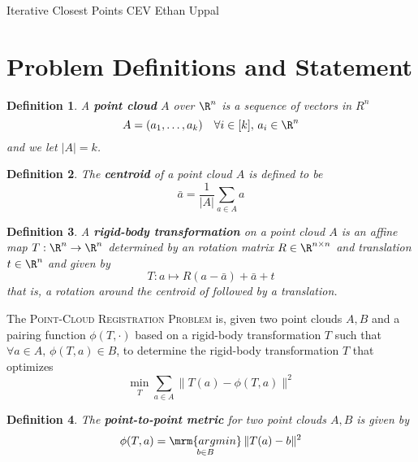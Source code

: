 \documentclass[12pt]{article}
\theoremstyle{defstyle}
\newtheorem{defn}{Definition}
\begin{document}
\begin{generic}
    Iterative Closest Points \hfill CEV \vbar Ethan Uppal
\end{generic}

\section{Problem Definitions and Statement}

\begin{defn}
    A \textbf{point cloud} $A$ over $\R^n$ is a sequence of vectors in $R^n$
    \[
        A = (a_1, \dots, a_k) \quad \forall i \in [k],\, a_i \in \R^n
    \]
    and we let $|A| = k$.
\end{defn}

\begin{defn}
    The \textbf{centroid} of a point cloud $A$ is defined to be
    \[
        \bar{a} = \frac{1}{|A|} \sum_{a \in A} a
    \]
\end{defn}

\begin{defn}
    A \textbf{rigid-body transformation} on a point cloud $A$ is an affine map $T : \R^n \to \R^n$ determined by an rotation matrix $R \in \R^{n \times n}$ and translation $t \in \R^n$ and given by
    \[
        T : a \mapsto R(a - \bar{a}) + \bar{a} + t
    \]
    that is, a rotation around the centroid of followed by a translation.
\end{defn}

\begin{outline}
    The \textsc{Point-Cloud Registration Problem} is, given two point clouds $A, B$ and a pairing function $\phi(T, \cdot)$ based on a rigid-body transformation $T$ such that $\forall a \in A,\, \phi(T, a) \in B$, to determine the rigid-body transformation $T$ that optimizes
    \begin{equation}\label{icp}
        \min\limits_{\substack{T}} \sum_{a \in A} \| T(a) - \phi(T, a) \|^2
    \end{equation}
\end{outline}

\begin{defn}
    The \textbf{point-to-point metric} for two point clouds $A, B$ is given by
    \begin{equation}
        \phi(T, a) = \mathop{\mrm{argmin}}\limits_{\substack{b \in B}} \| T(a) - b \|^2
    \end{equation}
\end{defn}
\end{document}

